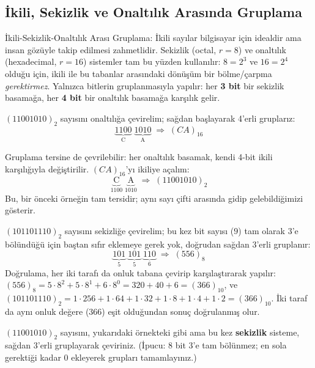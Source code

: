\subsection{İkili, Sekizlik ve Onaltılık Arasında Gruplama}
\label{sec:gruplama}

\begin{tanim}{İkili-Sekizlik-Onaltılık Arası Gruplama:}
İkili sayılar bilgisayar için idealdir ama insan gözüyle takip edilmesi zahmetlidir. Sekizlik
(octal, $r=8$) ve onaltılık (hexadecimal, $r=16$)
sistemler tam bu yüzden kullanılır: $8=2^3$ ve $16=2^4$ olduğu için, ikili ile bu tabanlar
arasındaki dönüşüm bir bölme/çarpma \emph{gerektirmez}. Yalnızca bitlerin gruplanmasıyla
yapılır: her \textbf{3 bit} bir sekizlik basamağa, her \textbf{4 bit} bir onaltılık basamağa
karşılık gelir.
\end{tanim}

\begin{ornek}
$(11001010)_2$ sayısını onaltılığa çevirelim; sağdan başlayarak 4'erli gruplarız:
\[
\underbrace{1100}_{\text{C}} \; \underbrace{1010}_{\text{A}} \;\Rightarrow\; (CA)_{16}
\]
\end{ornek}

\begin{ornek}
Gruplama tersine de çevrilebilir: her onaltılık basamak, kendi 4-bit ikili karşılığıyla
değiştirilir. $(CA)_{16}$'yı ikiliye açalım:
\[
\underbrace{\text{C}}_{1100} \; \underbrace{\text{A}}_{1010} \;\Rightarrow\; (11001010)_2
\]
Bu, bir önceki örneğin tam tersidir; aynı sayı çifti arasında gidip gelebildiğimizi gösterir.
\end{ornek}

\begin{ornek}
$(101101110)_2$ sayısını sekizliğe çevirelim; bu kez bit sayısı ($9$) tam olarak $3$'e
bölündüğü için baştan sıfır eklemeye gerek yok, doğrudan sağdan 3'erli gruplanır:
\[
\underbrace{101}_{5} \; \underbrace{101}_{5} \; \underbrace{110}_{6} \;\Rightarrow\; (556)_8
\]
Doğrulama, her iki tarafı da onluk tabana çevirip karşılaştırarak yapılır:
$(556)_8 = 5\cdot8^2+5\cdot8^1+6\cdot8^0=320+40+6=(366)_{10}$, ve
$(101101110)_2=1\cdot256+1\cdot64+1\cdot32+1\cdot8+1\cdot4+1\cdot2=(366)_{10}$. İki taraf da
aynı onluk değere ($366$) eşit olduğundan sonuç doğrulanmış olur. \checkmark
\end{ornek}

\begin{alistirma}[\kolay]
$(11001010)_2$ sayısını, yukarıdaki örnekteki gibi ama bu kez \textbf{sekizlik} sisteme,
sağdan 3'erli gruplayarak çeviriniz. (İpucu: 8 bit 3'e tam bölünmez; en sola gerektiği kadar
$0$ ekleyerek grupları tamamlayınız.)
\end{alistirma}

